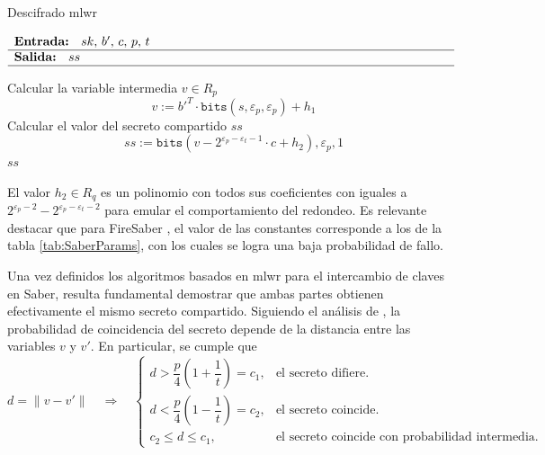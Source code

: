 \begin{algorithm}[H]
	\caption{Descifrado \acrshort{mlwr}} 
	$\begin{array}{p{\textwidth}}
		\textbf{Entrada: } \(sk\), \(b'\), \(c\), \(p\), \(t\)\\ 
		\hline
		\textbf{Salida: } \(ss\)\\ 
		\hline
	\end{array}$
	\begin{algorithmic}[1]
		\State Calcular la variable intermedia \(v\in R_p\)
		\begin{equation}
			v:=b'^T \cdot \texttt{bits}(s,\varepsilon_p,\varepsilon_p)+ h_1 
		\end{equation}
		\State Calcular el valor del secreto compartido \(ss\)
		\begin{equation}
			ss:=\texttt{bits}(v-2^{\varepsilon_p-\varepsilon_t-1}\cdot c+ h_2),\varepsilon_p,1
		\end{equation}
		\State \Return \(ss\)
	\end{algorithmic}
\end{algorithm}

El valor \(h_2\in  R_q\) es un polinomio con todos sus coeficientes con iguales a \(2^{\varepsilon_p-2}-2^{\varepsilon_p-\varepsilon_t-2}\) para emular el comportamiento del redondeo. Es relevante destacar que para FireSaber \cite{saber-spec-2020}, el valor de las constantes corresponde a los de la tabla \ref{tab:SaberParams}, con los cuales se logra una baja probabilidad de fallo.
\newline

Una vez definidos los algoritmos basados en \acrshort{mlwr} para el intercambio de claves en Saber, resulta fundamental demostrar que ambas partes obtienen efectivamente el mismo secreto compartido.  Siguiendo el análisis de \cite{Correctness}, la probabilidad de coincidencia del secreto depende de la distancia entre las variables \(v\) y \(v'\). En particular, se cumple que
\begin{equation}
	d = \|v - v'\| \quad \Rightarrow \quad
	\begin{cases}
		d > \dfrac{p}{4}\left(1+\dfrac{1}{t}\right) = c_1, & \text{el secreto difiere}. \\[2ex]
		d < \dfrac{p}{4}\left(1-\dfrac{1}{t}\right) = c_2, & \text{el secreto coincide}. \\[2ex]
		c_2 \leq d \leq c_1, & \text{el secreto coincide con probabilidad intermedia}.
	\end{cases}
\end{equation}

